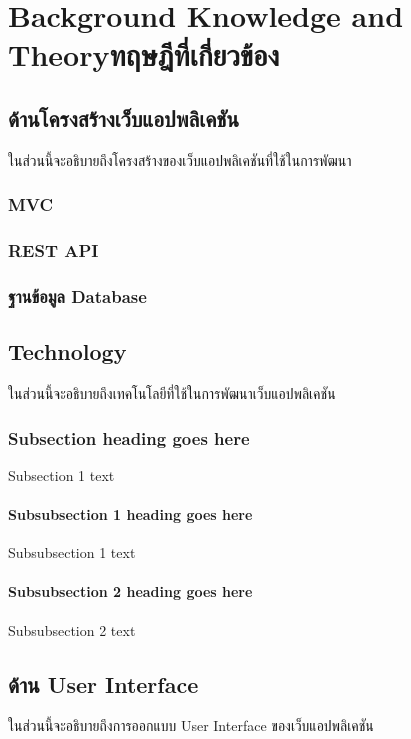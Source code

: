 \chapter{\ifenglish Background Knowledge and Theory\else ทฤษฎีที่เกี่ยวข้อง\fi}

\section{ด้านโครงสร้างเว็บแอปพลิเคชัน}
ในส่วนนี้จะอธิบายถึงโครงสร้างของเว็บแอปพลิเคชันที่ใช้ในการพัฒนา

\subsection{MVC}
\subsection{REST API}

\subsection{ฐานข้อมูล Database}
\section{Technology}
ในส่วนนี้จะอธิบายถึงเทคโนโลยีที่ใช้ในการพัฒนาเว็บแอปพลิเคชัน

\subsection{Subsection heading goes here}

Subsection 1 text

\subsubsection{Subsubsection 1 heading goes here}
Subsubsection 1 text

\subsubsection{Subsubsection 2 heading goes here}
Subsubsection 2 text

\section{ด้าน User Interface}
ในส่วนนี้จะอธิบายถึงการออกแบบ User Interface ของเว็บแอปพลิเคชัน


